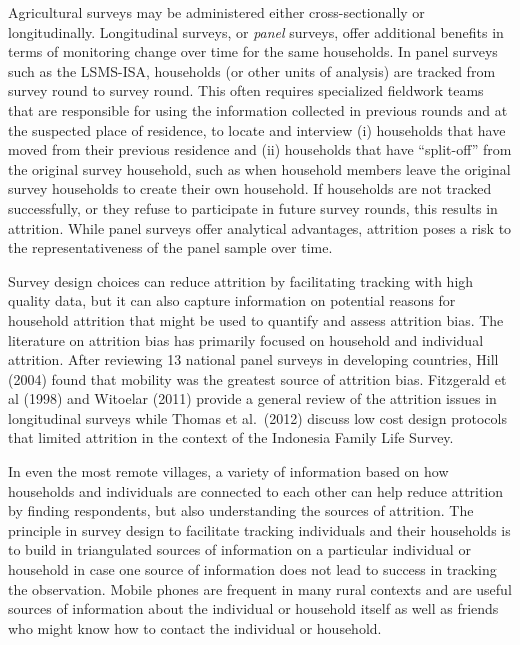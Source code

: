 \documentclass[
]{book}
\begin{document}
Agricultural surveys may be administered either cross-sectionally or longitudinally. Longitudinal surveys, or \emph{panel} surveys, offer additional benefits in terms of monitoring change over time for the same households. In panel surveys such as the LSMS-ISA, households (or other units of analysis) are tracked from survey round to survey round. This often requires specialized fieldwork teams that are responsible for using the information collected in previous rounds and at the suspected place of residence, to locate and interview (i) households that have moved from their previous residence and (ii) households that have ``split-off'' from the original survey household, such as when household members leave the original survey households to create their own household. If households are not tracked successfully, or they refuse to participate in future survey rounds, this results in attrition. While panel surveys offer analytical advantages, attrition poses a risk to the representativeness of the panel sample over time.

Survey design choices can reduce attrition by facilitating tracking with high quality data, but it can also capture information on potential reasons for household attrition that might be used to quantify and assess attrition bias. The literature on attrition bias has primarily focused on household and individual attrition. After reviewing 13 national panel surveys in developing countries, Hill (2004) found that mobility was the greatest source of attrition bias. Fitzgerald et al (1998) and Witoelar (2011) provide a general review of the attrition issues in longitudinal surveys while Thomas et al.~(2012) discuss low cost design protocols that limited attrition in the context of the Indonesia Family Life Survey.

In even the most remote villages, a variety of information based on how households and individuals are connected to each other can help reduce attrition by finding respondents, but also understanding the sources of attrition. The principle in survey design to facilitate tracking individuals and their households is to build in triangulated sources of information on a particular individual or household in case one source of information does not lead to success in tracking the observation. Mobile phones are frequent in many rural contexts and are useful sources of information about the individual or household itself as well as friends who might know how to contact the individual or household.
\end{document}
